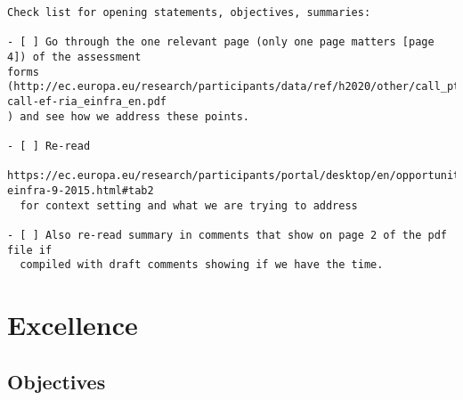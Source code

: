 \documentclass[noworkareas,deliverables,\classoptions]{euproposal}       %
\begin{document}
\begin{proposal}
\begin{draft}
\end{draft}
\begin{draft}

\begin{verbatim}
Check list for opening statements, objectives, summaries:

- [ ] Go through the one relevant page (only one page matters [page 4]) of the assessment
forms
(http://ec.europa.eu/research/participants/data/ref/h2020/other/call_ptef/ef/h2020-call-ef-ria_einfra_en.pdf
) and see how we address these points. 

- [ ] Re-read
  https://ec.europa.eu/research/participants/portal/desktop/en/opportunities/h2020/topics/2144-einfra-9-2015.html#tab2
  for context setting and what we are trying to address

- [ ] Also re-read summary in comments that show on page 2 of the pdf file if
  compiled with draft comments showing if we have the time.
\end{verbatim}
\clearpage
\end{draft}




\section{Excellence}



\subsection{Objectives}
\label{sect:objectives}



\end{proposal}
\end{document}
